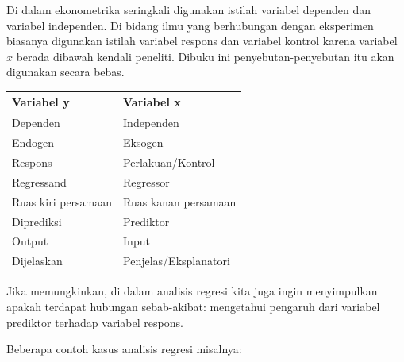 \documentclass[
]{book}
\begin{document}
Di dalam ekonometrika seringkali digunakan istilah variabel
dependen dan variabel independen. Di bidang ilmu yang berhubungan dengan
eksperimen biasanya digunakan istilah variabel respons dan variabel
kontrol karena variabel \(x\) berada dibawah kendali peneliti. Dibuku ini
penyebutan-penyebutan itu akan digunakan secara bebas.

\begin{table}
\centering
\begin{tabular}[t]{l|l}
\hline
Variabel y & Variabel x\\
\hline
Dependen & Independen\\
\hline
Endogen & Eksogen\\
\hline
Respons & Perlakuan/Kontrol\\
\hline
Regressand & Regressor\\
\hline
Ruas kiri persamaan & Ruas kanan persamaan\\
\hline
Diprediksi & Prediktor\\
\hline
Output & Input\\
\hline
Dijelaskan & Penjelas/Eksplanatori\\
\hline
\end{tabular}
\end{table}

Jika memungkinkan, di dalam analisis regresi kita juga ingin
menyimpulkan apakah terdapat hubungan sebab-akibat: mengetahui pengaruh
dari variabel prediktor terhadap variabel respons.

Beberapa contoh kasus analisis regresi misalnya:
\end{document}

